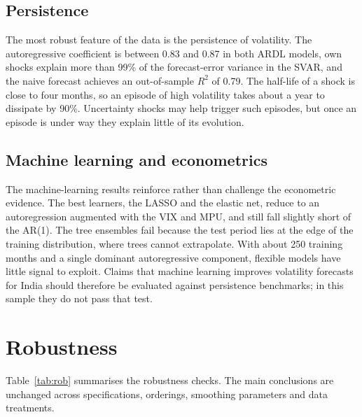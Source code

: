 \documentclass[10pt,twocolumn,a4paper]{article}
\begin{document}
\subsection{Persistence}

The most robust feature of the data is the persistence of volatility. The autoregressive coefficient is between 0.83 and 0.87 in both ARDL models, own shocks explain more than 99\% of the forecast-error variance in the SVAR, and the naive forecast achieves an out-of-sample $R^2$ of 0.79. The half-life of a shock is close to four months, so an episode of high volatility takes about a year to dissipate by 90\%. Uncertainty shocks may help trigger such episodes, but once an episode is under way they explain little of its evolution.

\subsection{Machine learning and econometrics}

The machine-learning results reinforce rather than challenge the econometric evidence. The best learners, the LASSO and the elastic net, reduce to an autoregression augmented with the VIX and MPU, and still fall slightly short of the AR(1). The tree ensembles fail because the test period lies at the edge of the training distribution, where trees cannot extrapolate. With about 250 training months and a single dominant autoregressive component, flexible models have little signal to exploit. Claims that machine learning improves volatility forecasts for India should therefore be evaluated against persistence benchmarks; in this sample they do not pass that test.

\section{Robustness}\label{sec:robust}

Table~\ref{tab:rob} summarises the robustness checks. The main conclusions are unchanged across specifications, orderings, smoothing parameters and data treatments.
\end{document}

